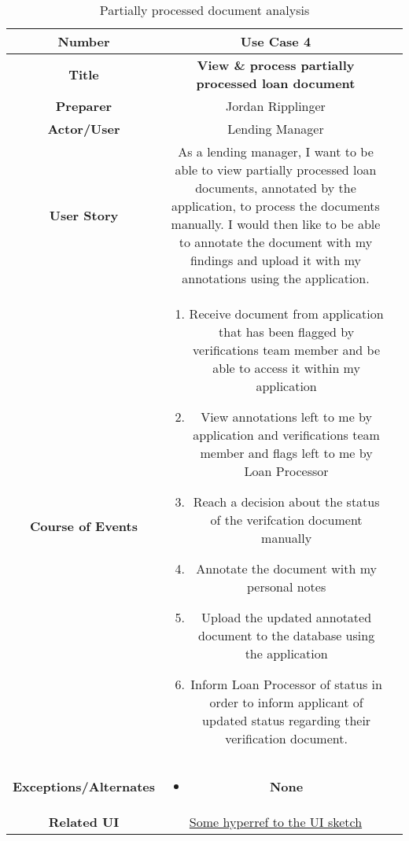 \begin{table}[H]
    \centering
    \begin{tabularx}{0.75\linewidth}{||Sc|X||}
        \hline
        \hline
        \textbf{Number} & \textbf{Use Case 4} \\
        \hline
        \textbf{Title} & \textbf{View \& process partially processed loan document} \\
        \hline
        \textbf{Preparer} & Jordan Ripplinger \\
        \hline
        \textbf{Actor/User} & Lending Manager \\
        \hline
        \textbf{User Story} &
        As a lending manager, I want to be able to view partially processed loan documents, annotated by the application, to process the documents manually. I would then like to be able to annotate the document with my findings and upload it with my annotations using the application. \\
        \hline
        \textbf{Course of Events} &
        \begin{minipage}[l]{\linewidth}
            \begin{enumerate}[wide, labelindent=0pt]
                \item Receive document from application that has been flagged by verifications team member and be able to access it within my application
                \item View annotations left to me by application and verifications team member and flags left to me by Loan Processor
                \item Reach a decision about the status of the verifcation document manually
                \item Annotate the document with my personal notes
                \item Upload the updated annotated document to the database using the application
                \item Inform Loan Processor of status in order to inform applicant of updated status regarding their verification document.
            \end{enumerate}
            \vspace{4pt}
        \end{minipage} \\
        \hline
        \textbf{Exceptions/Alternates} & 
        \begin{minipage}[l]{\linewidth}
            \vspace{2pt}
            \begin{itemize}[wide, labelindent=0pt]
                \item \textbf{None}
            \end{itemize}
        \end{minipage} \\
        \hline
        \textbf{Related UI} & \hyperref[templatesec]{Some hyperref to the UI sketch} \\
        \hline
        \hline
    \end{tabularx}
    \caption{Partially processed document analysis}
    \label{tab:use_case_partially_processed}
\end{table}

